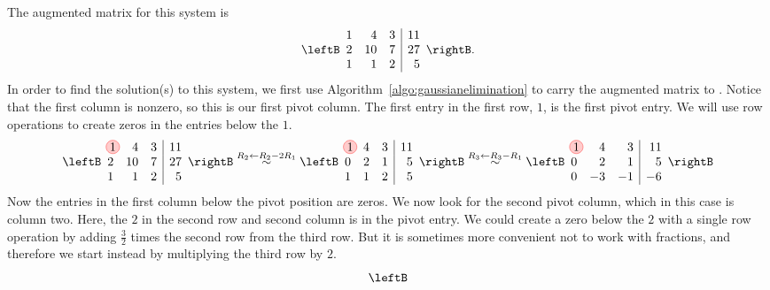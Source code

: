 \begin{solution} The augmented matrix for this system is
  \begin{equation*}
    \leftB
    \begin{array}{rrr|r}
      1 & 4 & 3 & 11 \\
      2 & 10 & 7 & 27 \\
      1 & 1 & 2 & 5
    \end{array}
    \rightB.
  \end{equation*}
  In order to find the solution(s) to this system, we first use
  Algorithm~\ref{algo:gaussianelimination} to carry the augmented
  matrix to {\ef}. Notice that the first column is nonzero, so this is
  our first pivot column. The first entry in the first row, $1$, is
  the first pivot entry. We will use row operations to create zeros in
  the entries below the $1$.
  \begin{equation*}
    \leftB
    \begin{array}{rrr|r}
      \circled{1} & 4 & 3 & 11 \\
      2 & 10 & 7 & 27 \\
      1 & 1 & 2 & 5
    \end{array}
    \rightB
    \stackrel{R_2\leftarrow R_2-2R_1}{\sim}
    \leftB
    \begin{array}{rrr|r}
      \circled{1} & 4 & 3 & 11 \\
      0 & 2 & 1 & 5 \\
      1 & 1 & 2 & 5
    \end{array}
    \rightB
    \stackrel{R_3\leftarrow R_3-R_1}{\sim}
    \leftB
    \begin{array}{rrr|r}
      \circled{1} & 4 & 3 & 11 \\
      0 & 2 & 1 & 5 \\
      0 & -3 & -1 & -6
    \end{array}
    \rightB
  \end{equation*}
  Now the entries in the first column below the pivot position are
  zeros. We now look for the second pivot column, which in this case
  is column two.  Here, the $2$ in the second row and second column is
  in the pivot entry. We could create a zero below the $2$ with a
  single row operation by adding $\frac{3}{2}$ times the second row
  from the third row. But it is sometimes more convenient not to work
  with fractions, and therefore we start instead by multiplying the
  third row by $2$.
  \begin{equation*}
    \leftB
    \begin{array}{rrr|r}

\end{array}
\end{equation*}
\end{solution}
